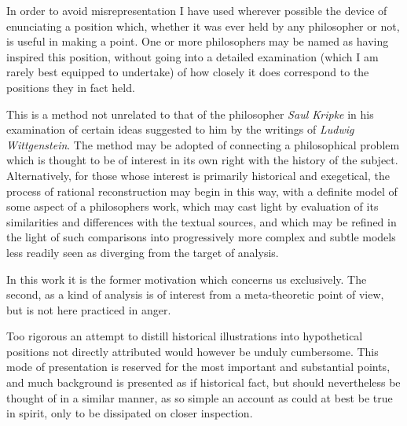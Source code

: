In order to avoid misrepresentation I have used wherever possible the
device of enunciating a position which, whether it was ever held by
any philosopher or not, is useful in making a point.
One or more philosophers may be named as having inspired this
position, without going into a detailed examination (which I am
rarely best equipped to undertake) of how closely it does correspond to
the positions they in fact held.

This is a method not unrelated to that of the philosopher {\it Saul
  Kripke} in his examination of certain ideas suggested to him by the
writings of {\it Ludwig Wittgenstein}.
The method may be adopted of connecting a philosophical problem which
is thought to be of interest in its own right with the history of the
subject.
Alternatively, for those whose interest is primarily historical and
exegetical, the process of rational reconstruction may begin in this
way, with a definite model of some aspect of a philosophers work,
which may cast light by evaluation of its similarities and differences
with the textual sources, and which may be refined in the light of
such comparisons into progressively more complex and subtle models
less readily seen as diverging from the target of analysis.

In this work it is the former motivation which concerns us
exclusively.
The second, as a kind of analysis is of interest from a meta-theoretic
point of view, but is not here practiced in anger. 

Too rigorous an attempt to distill historical illustrations into
hypothetical positions not directly attributed would however be unduly
cumbersome.
This mode of presentation is reserved for the most important and
substantial points, and much background is presented as if historical
fact, but should nevertheless be thought of in a similar manner, as so
simple an account as could at best be true in spirit, only to be
dissipated on closer inspection.
